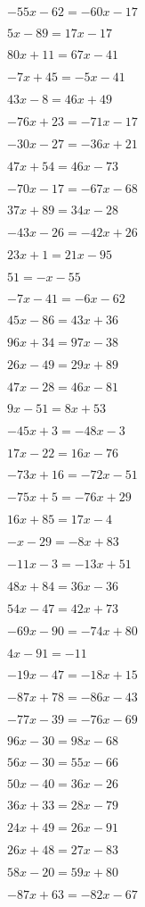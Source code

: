 \item $-55x-62 = -60x-17$
\item $5x-89 = 17x-17$
\item $80x+11 = 67x-41$
\item $-7x+45 = -5x-41$
\item $43x-8 = 46x+49$
\item $-76x+23 = -71x-17$
\item $-30x-27 = -36x+21$
\item $47x+54 = 46x-73$
\item $-70x-17 = -67x-68$
\item $37x+89 = 34x-28$
\item $-43x-26 = -42x+26$
\item $23x+1 = 21x-95$
\item $51 = -x-55$
\item $-7x-41 = -6x-62$
\item $45x-86 = 43x+36$
\item $96x+34 = 97x-38$
\item $26x-49 = 29x+89$
\item $47x-28 = 46x-81$
\item $9x-51 = 8x+53$
\item $-45x+3 = -48x-3$
\item $17x-22 = 16x-76$
\item $-73x+16 = -72x-51$
\item $-75x+5 = -76x+29$
\item $16x+85 = 17x-4$
\item $-x-29 = -8x+83$
\item $-11x-3 = -13x+51$
\item $48x+84 = 36x-36$
\item $54x-47 = 42x+73$
\item $-69x-90 = -74x+80$
\item $4x-91 = -11$
\item $-19x-47 = -18x+15$
\item $-87x+78 = -86x-43$
\item $-77x-39 = -76x-69$
\item $96x-30 = 98x-68$
\item $56x-30 = 55x-66$
\item $50x-40 = 36x-26$
\item $36x+33 = 28x-79$
\item $24x+49 = 26x-91$
\item $26x+48 = 27x-83$
\item $58x-20 = 59x+80$
\item $-87x+63 = -82x-67$
